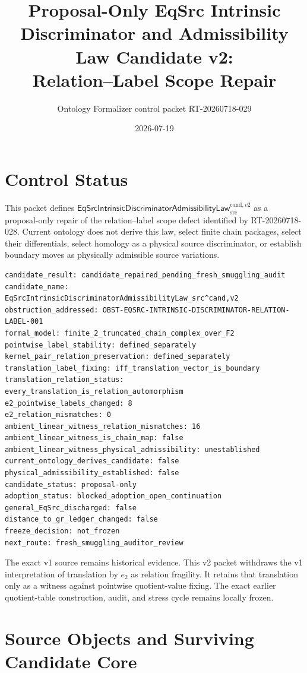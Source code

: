\documentclass[11pt]{article}
\title{Proposal-Only EqSrc Intrinsic Discriminator and Admissibility Law Candidate v2:\\
Relation--Label Scope Repair}
\author{Ontology Formalizer control packet RT-20260718-029}
\date{2026-07-19}
\begin{document}
\maketitle

\section{Control Status}

This packet defines
\(\mathsf{EqSrcIntrinsicDiscriminatorAdmissibilityLaw}^{\mathrm{cand},v2}_{\mathrm{src}}\)
as a proposal-only repair of the relation--label scope defect identified by
RT-20260718-028. Current ontology does not derive this law, select finite
chain packages, select their differentials, select homology as a physical
source discriminator, or establish boundary moves as physically admissible
source variations.

\begin{verbatim}
candidate_result: candidate_repaired_pending_fresh_smuggling_audit
candidate_name: EqSrcIntrinsicDiscriminatorAdmissibilityLaw_src^cand,v2
obstruction_addressed: OBST-EQSRC-INTRINSIC-DISCRIMINATOR-RELATION-LABEL-001
formal_model: finite_2_truncated_chain_complex_over_F2
pointwise_label_stability: defined_separately
kernel_pair_relation_preservation: defined_separately
translation_label_fixing: iff_translation_vector_is_boundary
translation_relation_status: every_translation_is_relation_automorphism
e2_pointwise_labels_changed: 8
e2_relation_mismatches: 0
ambient_linear_witness_relation_mismatches: 16
ambient_linear_witness_is_chain_map: false
ambient_linear_witness_physical_admissibility: unestablished
current_ontology_derives_candidate: false
physical_admissibility_established: false
candidate_status: proposal-only
adoption_status: blocked_adoption_open_continuation
general_EqSrc_discharged: false
distance_to_gr_ledger_changed: false
freeze_decision: not_frozen
next_route: fresh_smuggling_auditor_review
\end{verbatim}

The exact v1 source remains historical evidence. This v2 packet withdraws the
v1 interpretation of translation by \(e_2\) as relation fragility. It retains
that translation only as a witness against pointwise quotient-value fixing.
The exact earlier quotient-table construction, audit, and stress cycle remains
locally frozen.

\section{Source Objects and Surviving Candidate Core}
\end{document}
